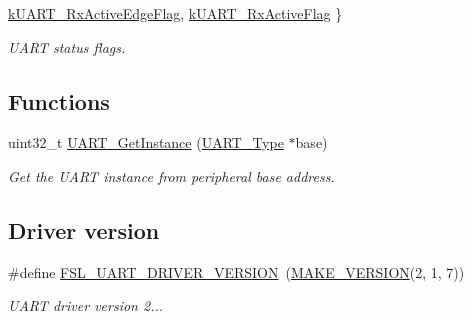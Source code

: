 \begin{DoxyCompactItemize}
\newline
\mbox{\hyperlink{group__uart__driver_gga259a53f363288115306a45d08fc66eb8adcfe89feb164ff5b1720312922006a7a}{k\+U\+A\+R\+T\+\_\+\+Rx\+Active\+Edge\+Flag}}, 
\mbox{\hyperlink{group__uart__driver_gga259a53f363288115306a45d08fc66eb8a7a4521cd44a3272a94784670d1bf5a0c}{k\+U\+A\+R\+T\+\_\+\+Rx\+Active\+Flag}}
 \}
\begin{DoxyCompactList}\small\item\em U\+A\+RT status flags. \end{DoxyCompactList}\end{DoxyCompactItemize}
\subsection*{Functions}
\begin{DoxyCompactItemize}
\item 
uint32\+\_\+t \mbox{\hyperlink{group__uart__driver_gadeeb40cdc314638d4355ef906f1c408d}{U\+A\+R\+T\+\_\+\+Get\+Instance}} (\mbox{\hyperlink{struct_u_a_r_t___type}{U\+A\+R\+T\+\_\+\+Type}} $\ast$base)
\begin{DoxyCompactList}\small\item\em Get the U\+A\+RT instance from peripheral base address. \end{DoxyCompactList}\end{DoxyCompactItemize}
\subsection*{Driver version}
\begin{DoxyCompactItemize}
\item 
\mbox{\label{group__uart__driver_ga89f9649bfe350eb7b1e53146f35d3de5}} 
\#define \mbox{\hyperlink{group__uart__driver_ga89f9649bfe350eb7b1e53146f35d3de5}{F\+S\+L\+\_\+\+U\+A\+R\+T\+\_\+\+D\+R\+I\+V\+E\+R\+\_\+\+V\+E\+R\+S\+I\+ON}}~(\mbox{\hyperlink{group__ftfx__utilities_ga812138aa3315b0c6953c1a26130bcc37}{M\+A\+K\+E\+\_\+\+V\+E\+R\+S\+I\+ON}}(2, 1, 7))
\begin{DoxyCompactList}\small\item\em U\+A\+RT driver version 2... \end{DoxyCompactList}\end{DoxyCompactItemize}
